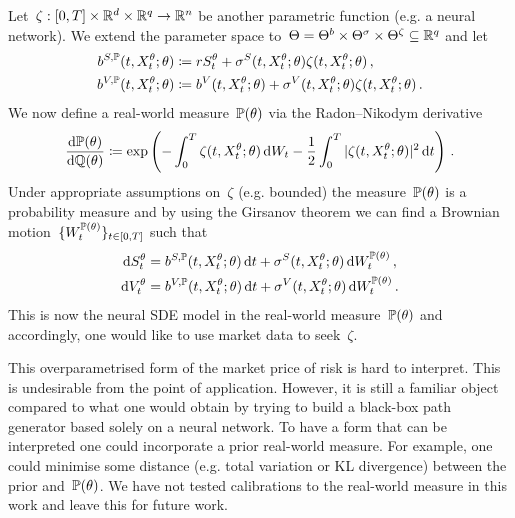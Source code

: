 Let~${\zeta:[0, T]\times \mathbb{R}^d \times \mathbb{R}^q \to \mathbb{R}^n}$ be another parametric function (e.g. a neural network). We extend the parameter space to~$\Theta = \Theta^b\times \Theta^\sigma \times \Theta^\zeta \subseteq \mathbb{R}^{q}$
and let 
\[
\begin{split}
b^{S,\mathbb{P}}(t,X^\theta_t;\theta) & \coloneqq  r S^\theta_t + \sigma^S(t,X^\theta_t; \theta) \zeta(t,X^\theta_t;\theta)\,,\\
b^{V,\mathbb{P}}(t,X^\theta_t;\theta) & \coloneqq  b^V(t,X^\theta_t;\theta) + \sigma^V(t,X^\theta_t; \theta) \zeta(t,X^\theta_t; \theta)\,.
\end{split}
\]
We now define a real-world measure~$\mathbb{P}(\theta)$ via the Radon--Nikodym derivative 
\[
\frac{\mathrm{d}\mathbb{P}(\theta)}{\mathrm{d}\mathbb{Q}(\theta)} \coloneqq  \exp\left(-\int_0^T \zeta(t,X^\theta_t;\theta) \,\mathrm{d} W_t - \frac12 \int_0^T |\zeta(t,X^\theta_t;\theta)|^2\,\mathrm{d} t \right)\,.
\]
Under appropriate assumptions on~$\zeta$ (e.g. bounded) the measure~$\mathbb{P}(\theta)$ is a probability measure and by using the Girsanov theorem we can find a Brownian motion~$\{W^{\mathbb{P}(\theta)}_t\}_{t\in[0, T]}$ such that 
\begin{equation}\label{eq:rvsde}
\begin{split}
\mathrm{d} S^{\theta}_t & = b^{S,\mathbb{P}}(t, X^\theta_t; \theta) \,\mathrm{d} t + \sigma^S(t,X_t^\theta;\theta )\,\mathrm{d} W^{\mathbb{P}(\theta)}_t\,,\\
\mathrm{d} V^\theta_t & = b^{V, \mathbb{P}}(t,X_t^{\theta}; \theta) \,\mathrm{d} t + \sigma^V(t,X_t^\theta;\theta )\,\mathrm{d} W^{\mathbb{P}(\theta)}_t\,.
\end{split}
\end{equation}	
This is now the neural SDE model in the real-world measure~$\mathbb{P}(\theta)$ and accordingly, one would like to use market data to seek~$\zeta$. 

This overparametrised form of the market price of risk is hard to interpret. This is undesirable from the point of application. 
However, it is still a familiar object compared to what one would obtain 
by trying to build a black-box path generator based solely on a neural network.
To have a form that can be interpreted one could incorporate a prior real-world measure.
For example, one could minimise some distance (e.g. total variation or KL divergence) between the prior and~$\mathbb{P}(\theta)$. 
We have not tested calibrations to the real-world measure in this work and leave this for future work. 


